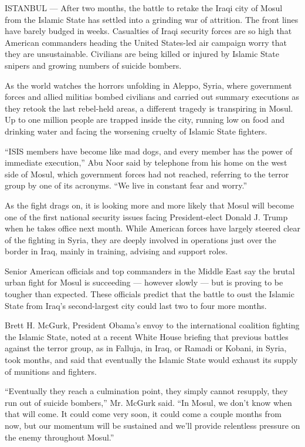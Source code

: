 ISTANBUL --- After two months, the battle to retake the Iraqi city of
Mosul from the Islamic State has settled into a grinding war of
attrition. The front lines have barely budged in weeks. Casualties of
Iraqi security forces are so high that American commanders heading the
United States-led air campaign worry that they are unsustainable.
Civilians are being killed or injured by Islamic State snipers and
growing numbers of suicide bombers.

As the world watches the horrors unfolding in Aleppo, Syria, where
government forces and allied militias bombed civilians and carried out
summary executions as they retook the last rebel-held areas, a different
tragedy is transpiring in Mosul. Up to one million people are trapped
inside the city, running low on food and drinking water and facing the
worsening cruelty of Islamic State fighters.

``ISIS members have become like mad dogs, and every member has the power
of immediate execution,'' Abu Noor said by telephone from his home on
the west side of Mosul, which government forces had not reached,
referring to the terror group by one of its acronyms. ``We live in
constant fear and worry.''

As the fight drags on, it is looking more and more likely that Mosul
will become one of the first national security issues facing
President-elect Donald J. Trump when he takes office next month. While
American forces have largely steered clear of the fighting in Syria,
they are deeply involved in operations just over the border in Iraq,
mainly in training, advising and support roles.

Senior American officials and top commanders in the Middle East say the
brutal urban fight for Mosul is succeeding --- however slowly --- but is
proving to be tougher than expected. These officials predict that the
battle to oust the Islamic State from Iraq's second-largest city could
last two to four more months.

Brett H. McGurk, President Obama's envoy to the international coalition
fighting the Islamic State, noted at a recent White House briefing that
previous battles against the terror group, as in Falluja, in Iraq, or
Ramadi or Kobani, in Syria, took months, and said that eventually the
Islamic State would exhaust its supply of munitions and fighters.

``Eventually they reach a culmination point, they simply cannot
resupply, they run out of suicide bombers,'' Mr. McGurk said. ``In
Mosul, we don't know when that will come. It could come very soon, it
could come a couple months from now, but our momentum will be sustained
and we'll provide relentless pressure on the enemy throughout Mosul.''

